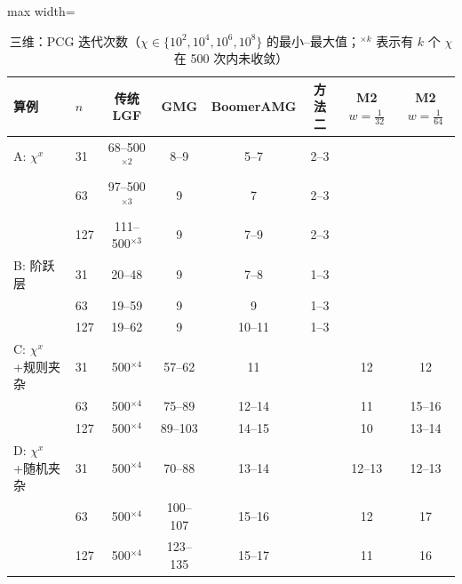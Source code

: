 \begin{table}[H]\centering\small
\caption{三维：PCG 迭代次数（$\chi\in\{10^2,10^4,10^6,10^8\}$ 的最小--最大值；$^{\times k}$ 表示有 $k$ 个 $\chi$ 在 500 次内未收敛）}\label{tab:its3d}
\begin{adjustbox}{max width=\textwidth}
\begin{tabular}{llcccccc}
\toprule
算例 & $n$ & 传统 LGF & GMG & BoomerAMG & 方法二 & M2 $w{=}\frac1{32}$ & M2 $w{=}\frac1{64}$ \\
\midrule
A: $\chi^x$ & 31 & 68--500$^{\times2}$ & 8--9 & 5--7 & 2--3 &  &  \\
 & 63 & 97--500$^{\times3}$ & 9 & 7 & 2--3 &  &  \\
 & 127 & 111--500$^{\times3}$ & 9 & 7--9 & 2--3 &  &  \\
\midrule
B: 阶跃层 & 31 & 20--48 & 9 & 7--8 & 1--3 &  &  \\
 & 63 & 19--59 & 9 & 9 & 1--3 &  &  \\
 & 127 & 19--62 & 9 & 10--11 & 1--3 &  &  \\
\midrule
C: $\chi^x$+规则夹杂 & 31 & 500$^{\times4}$ & 57--62 & 11 &  & 12 & 12 \\
 & 63 & 500$^{\times4}$ & 75--89 & 12--14 &  & 11 & 15--16 \\
 & 127 & 500$^{\times4}$ & 89--103 & 14--15 &  & 10 & 13--14 \\
\midrule
D: $\chi^x$+随机夹杂 & 31 & 500$^{\times4}$ & 70--88 & 13--14 &  & 12--13 & 12--13 \\
 & 63 & 500$^{\times4}$ & 100--107 & 15--16 &  & 12 & 17 \\
 & 127 & 500$^{\times4}$ & 123--135 & 15--17 &  & 11 & 16 \\
\bottomrule
\end{tabular}
\end{adjustbox}
\end{table}

